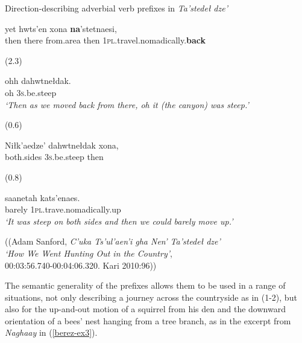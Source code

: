 \begin{exe}
 \ex Direction-describing adverbial verb prefixes in \textit{Ta’stedeł dze’}\label{berez-ex2}
 \begin{xlistn}
  	yet		hwts’en	xona	\textbf{na}’stetnaesi,\\
		then			there	from.area	then		1\textsc{pl}.travel.nomadically.\textbf{back}\\
\sn \begin{flushright}(2.3)\end{flushright}
 \gll			ohh	dahwtnełdak. \\
		oh		3\textsc{s}.be.steep\\
		\textit{‘Then as we moved back from there, oh it (the canyon) was steep.’}
\sn \begin{flushright}(0.6)\end{flushright}
 \gll			Niłk’aedze’	dahwtnełdak	xona, \\
		both.sides		3\textsc{s}.be.steep		then\\
\sn \begin{flushright}(0.8)\end{flushright}
	\gll		saanetah	kats’enaes. \\
		barely		1\textsc{pl}.trave.nomadically.up\\
\glt	\textit{	‘It was steep on both sides and then we could barely move up.’}

\end{xlistn}
\begin{flushright}
((Adam Sanford, \textit{C’uka Ts’ul’aen’i gha Nen’ Ta’stedeł dze’}\\
\textit{‘How We Went Hunting Out in the Country’},\\
00:03:56.740-00:04:06.320. Kari 2010:96))
\end{flushright}
\end{exe}

\noindent
The semantic generality of the prefixes allows them to be used in a range of situations, not only describing a journey across the countryside as in (1-2), but also for the up-and-out motion of a squirrel from his den and the downward orientation of a bees’ nest hanging from a tree branch, as in the excerpt from \textit{Naghaay} in (\ref{berez-ex3}).


